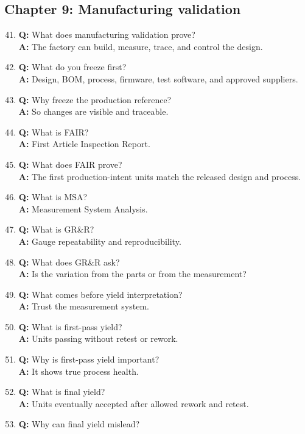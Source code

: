 \subsection{Chapter 9: Manufacturing validation}
\begin{enumerate}
\setcounter{enumi}{40}
\item \textbf{Q:} What does manufacturing validation prove?\\
\textbf{A:} The factory can build, measure, trace, and control the design.
\item \textbf{Q:} What do you freeze first?\\
\textbf{A:} Design, BOM, process, firmware, test software, and approved
suppliers.
\item \textbf{Q:} Why freeze the production reference?\\
\textbf{A:} So changes are visible and traceable.
\item \textbf{Q:} What is FAIR?\\
\textbf{A:} First Article Inspection Report.
\item \textbf{Q:} What does FAIR prove?\\
\textbf{A:} The first production-intent units match the released design and
process.
\item \textbf{Q:} What is MSA?\\
\textbf{A:} Measurement System Analysis.
\item \textbf{Q:} What is GR\&R?\\
\textbf{A:} Gauge repeatability and reproducibility.
\item \textbf{Q:} What does GR\&R ask?\\
\textbf{A:} Is the variation from the parts or from the measurement?
\item \textbf{Q:} What comes before yield interpretation?\\
\textbf{A:} Trust the measurement system.
\item \textbf{Q:} What is first-pass yield?\\
\textbf{A:} Units passing without retest or rework.
\item \textbf{Q:} Why is first-pass yield important?\\
\textbf{A:} It shows true process health.
\item \textbf{Q:} What is final yield?\\
\textbf{A:} Units eventually accepted after allowed rework and retest.
\item \textbf{Q:} Why can final yield mislead?\\

\end{enumerate}
